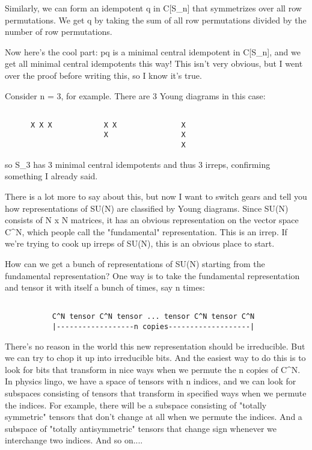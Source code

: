 Similarly, we can form an idempotent q in C[S_{n}] that
symmetrizes over all row permutations.  We get q by taking the sum of
all row permutations divided by the number of row permutations.

Now here's the cool part: pq is a minimal central idempotent in
C[S_{n}], and we get all minimal central idempotents this way!
This isn't very obvious, but I went over the proof before writing this,
so I know it's true.

Consider n = 3, for example.  There are 3 Young diagrams in this case:

\begin{verbatim}

      X X X            X X               X
                       X                 X
                                         X
\end{verbatim}
    
so S_{3} has 3 minimal central idempotents and thus 3 irreps,
confirming something I already said.

There is a lot more to say about this, but now I want to switch gears
and tell you how representations of SU(N) are classified by Young
diagrams.   Since SU(N) consists of N x N matrices, it has an obvious
representation on the vector space C^N, which people call the
"fundamental" representation.   This is an irrep.  If we're trying to
cook up irreps of SU(N), this is an obvious place to start.

How can we get a bunch of representations of SU(N) starting from the
fundamental representation?  One way is to take the fundamental
representation and tensor it with itself a bunch of times, say n times:


\begin{verbatim}

           C^N tensor C^N tensor ... tensor C^N tensor C^N
           |------------------n copies-------------------|

\end{verbatim}
    
There's no reason in the world this new representation should be
irreducible.  But we can try to chop it up into irreducible bits.  And
the easiest way to do this is to look for bits that transform in nice
ways when we permute the n copies of C^N.  In physics lingo, we have a
space of tensors with n indices, and we can look for subspaces
consisting of tensors that transform in specified ways when we permute
the indices.  For example, there will be a subspace consisting of
"totally symmetric" tensors that don't change at all when we
permute the indices.  And a subspace of "totally
antisymmetric" tensors that change sign whenever we interchange two
indices.  And so on....


